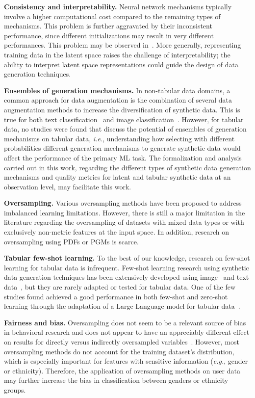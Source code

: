\textbf{Consistency and interpretability.} Neural network mechanisms typically
involve a higher computational cost compared to the remaining types of
mechanisms. This problem is further aggravated by their inconsistent
performance, since different initializations may result in very different
performances. This problem may be observed in~\cite{douzas2018effective}. More
generally, representing training data in the latent space raises the
challenge of interpretability; the ability to interpret latent space
representations could guide the design of data generation techniques. 

\textbf{Ensembles of generation mechanisms.} In non-tabular data domains,
a common approach for data augmentation is the combination of several data
augmentation methods to increase the diversification of synthetic data. This
is true for both text classification~\cite{bayer2021survey} and image
classification~\cite{grill2020bootstrap}. However, for tabular data, no
studies were found that discuss the potential of ensembles of generation
mechanisms on tabular data, \textit{i.e.}, understanding how selecting with
different probabilities different generation mechanisms to generate synthetic
data would affect the performance of the primary ML task. The formalization
and analysis carried out in this work, regarding the different types of
synthetic data generation mechanisms and quality metrics for latent and
tabular synthetic data at an observation level, may facilitate this work.


\textbf{Oversampling.} Various oversampling methods have been proposed to
address imbalanced learning limitations. However, there is still a major
limitation in the literature regarding the oversampling of datasets with mixed
data types or with exclusively non-metric features at the input space. In
addition, research on oversampling using PDFs or PGMs is scarce.

\textbf{Tabular few-shot learning.} To the best of our knowledge,
research on few-shot learning for tabular data is infrequent. Few-shot
learning research using synthetic data generation techniques has been
extensively developed using image~\cite{cubuk2019autoaugment, zhao2019data}
and text data~\cite{zhou2021flipda}, but they are rarely adapted or tested for
tabular data. One of the few studies found achieved a good performance in both
few-shot and zero-shot learning through the adaptation of a Large Language
model for tabular data~\cite{hegselmann2022tabllm}. 

\textbf{Fairness and bias.} Oversampling does not seem to be a relevant
source of bias in behavioral research and does not appear to have an
appreciably different effect on results for directly versus indirectly
oversampled variables~\cite{hauner2014latent}. However, most oversampling
methods do not account for the training dataset's distribution, which is
especially important for features with sensitive information (\textit{e.g.},
gender or ethnicity). Therefore, the application of oversampling methods on
user data may further increase the bias in classification between genders or
ethnicity groups.

